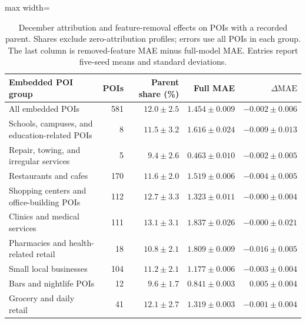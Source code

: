 \begin{table}[!htbp]
\centering
\begingroup
\singlespacing
\fontsize{9pt}{10.5pt}\selectfont
\setlength{\tabcolsep}{4pt}
\renewcommand{\arraystretch}{1.08}
\caption{December attribution and feature-removal effects on POIs with a recorded parent. Shares exclude zero-attribution profiles; errors use all POIs in each group. The last column is removed-feature MAE minus full-model MAE. Entries report five-seed means and standard deviations.}
\label{tab_parent}
\begin{adjustbox}{max width=\linewidth}
\begin{tabular}{lrrrr}
\toprule
Embedded POI group & POIs & Parent share (\%) & Full MAE & $\Delta\mathrm{MAE}$ \\
\midrule
All embedded POIs & 581 & $12.0\pm 2.5$ & $1.454\pm 0.009$ & $-0.002\pm 0.006$ \\
Schools, campuses, and education-related POIs & 8 & $11.5\pm 3.2$ & $1.616\pm 0.024$ & $-0.009\pm 0.013$ \\
Repair, towing, and irregular services & 5 & $9.4\pm 2.6$ & $0.463\pm 0.010$ & $-0.002\pm 0.005$ \\
Restaurants and cafes & 170 & $11.6\pm 2.0$ & $1.519\pm 0.006$ & $-0.004\pm 0.005$ \\
Shopping centers and office-building POIs & 112 & $12.7\pm 3.3$ & $1.323\pm 0.011$ & $-0.000\pm 0.004$ \\
Clinics and medical services & 111 & $13.1\pm 3.1$ & $1.837\pm 0.026$ & $-0.000\pm 0.021$ \\
Pharmacies and health-related retail & 18 & $10.8\pm 2.1$ & $1.809\pm 0.009$ & $-0.016\pm 0.005$ \\
Small local businesses & 104 & $11.2\pm 2.1$ & $1.177\pm 0.006$ & $-0.003\pm 0.004$ \\
Bars and nightlife POIs & 12 & $9.6\pm 1.7$ & $0.841\pm 0.003$ & $0.005\pm 0.004$ \\
Grocery and daily retail & 41 & $12.1\pm 2.7$ & $1.319\pm 0.003$ & $-0.001\pm 0.004$ \\
\bottomrule
\end{tabular}
\end{adjustbox}
\endgroup
\end{table}
